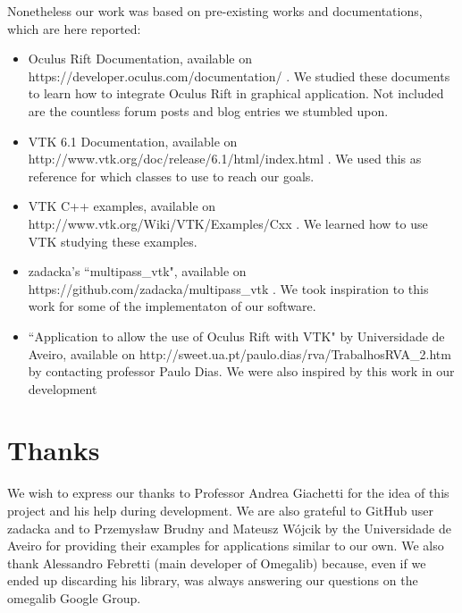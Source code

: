 \documentclass[11pt]{article} %
\begin{document}
Nonetheless our work was based on pre-existing works and documentations, which are here reported:
\begin{itemize}
\item Oculus Rift Documentation, available on https://developer.oculus.com/documentation/ . We studied these documents to learn how to integrate Oculus Rift in graphical application. Not included are the countless forum posts and blog entries we stumbled upon.
\item VTK 6.1 Documentation, available on http://www.vtk.org/doc/release/6.1/html/index.html . We used this as reference for which classes to use to reach our goals.
\item VTK C++ examples, available on http://www.vtk.org/Wiki/VTK/Examples/Cxx . We learned how to use VTK studying these examples.
\item zadacka's ``multipass\_vtk", available on https://github.com/zadacka/multipass\_vtk . We took inspiration to this work for some of the  implementaton of our software.
\item ``Application to allow the use of Oculus Rift with VTK" by Universidade de Aveiro, available on http://sweet.ua.pt/paulo.dias/rva/TrabalhosRVA\_2.htm by contacting professor Paulo Dias. We were also inspired by this work in our development
\end{itemize}

\newpage


\section{Thanks}
We wish to express our thanks to Professor Andrea Giachetti for the idea of this project and his help during development.
We are also grateful to GitHub user zadacka and to Przemysław Brudny and Mateusz Wójcik by the Universidade de Aveiro for providing their examples for applications similar to our own.
We also thank Alessandro Febretti (main developer of Omegalib) because, even if we ended up discarding his library, was always answering our questions on the omegalib Google Group.
\end{document}
